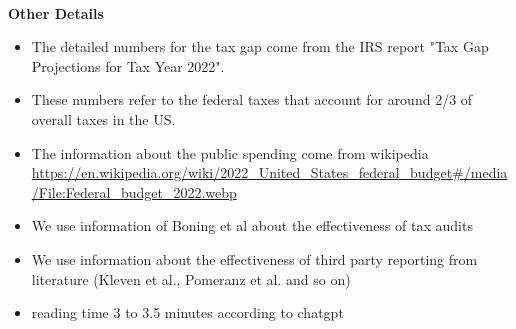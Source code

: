 \documentclass[12pt]{article}
\begin{document}
\\
\textbf{Other Details}
\begin{itemize}
    \item The detailed numbers for the tax gap come from the IRS report "Tax Gap Projections for Tax Year 2022".
    \item These numbers refer to the federal taxes that account for around 2/3 of overall taxes in the US. 
    \item The information about the public spending come from wikipedia \url{https://en.wikipedia.org/wiki/2022_United_States_federal_budget#/media/File:Federal_budget_2022.webp}
    \item We use information of Boning et al about the effectiveness of tax audits
    \item We use information about the effectiveness of third party reporting from literature (Kleven et al., Pomeranz et al. and so on)
    \item reading time 3 to 3.5 minutes according to chatgpt
\end{itemize}
\end{document}
